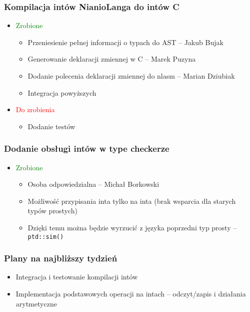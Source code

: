 \documentclass{beamer}
\begin{document}
	\begin{frame}
		\frametitle{Kompilacja intów NianioLanga do intów C}
		\begin{itemize}
			\item\textcolor{green}{Zrobione}
			\begin{itemize}
				\item Przeniesienie pełnej informacji o typach do AST -- Jakub Bujak
				\item Generowanie deklaracji zmiennej w C -- Marek Puzyna
				\item Dodanie polecenia deklaracji zmiennej do nlasm -- Marian Dziubiak
				\item Integracja powyższych
			\end{itemize}
			\item\textcolor{red}{Do zrobienia}
			\begin{itemize}
				\item Dodanie testów
			\end{itemize}
		\end{itemize}
	\end{frame}
	
	\begin{frame}
		\frametitle{Dodanie obsługi intów w type checkerze}
		\begin{itemize}
			\item\textcolor{green}{Zrobione}
			\begin{itemize}
				\item Osoba odpowiedzialna -- Michał Borkowski
				\item Możliwość przypisania inta tylko na inta (brak wsparcia dla starych typów prostych)
				\item Dzięki temu można będzie wyrzucić z języka poprzedni typ prosty -- \texttt{ptd::sim()}
			\end{itemize}
		\end{itemize}
	\end{frame}
	
	\begin{frame}
		\frametitle{Plany na najbliższy tydzień}
		\begin{itemize}
			\item Integracja i testowanie kompilacji intów
			\item Implementacja podstawowych operacji na intach -- odczyt/zapis i działania arytmetyczne
		\end{itemize}
	\end{frame}
\end{document}
